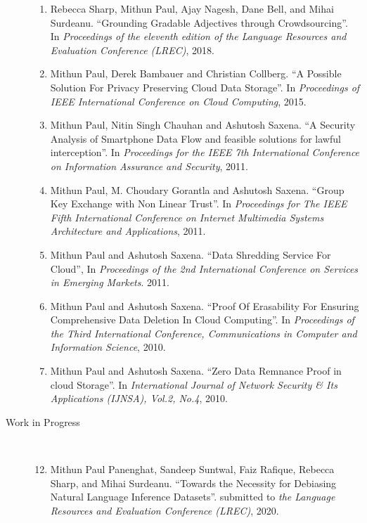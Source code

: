 \documentclass[10pt]{article}
\newcommand{\ve}[1]{{\em #1}} %
\newcommand{\ti}[1]{``#1''} %
\begin{document}
\begin{description}
\begin{enumerate}
\item Rebecca Sharp, Mithun Paul, Ajay Nagesh, Dane  Bell, and Mihai Surdeanu.   \ti{Grounding Gradable Adjectives through Crowdsourcing}. In \ve{Proceedings of the eleventh edition of the Language Resources and Evaluation Conference (LREC)}, 2018.

\item Mithun Paul, Derek Bambauer and Christian Collberg.   \ti{A Possible Solution For Privacy Preserving Cloud Data Storage}. In \ve{Proceedings of IEEE International Conference on Cloud Computing}, 2015.

\item  Mithun Paul, Nitin Singh Chauhan and Ashutosh Saxena.   \ti{A Security Analysis of Smartphone Data Flow and feasible solutions for lawful interception}. In \ve{ Proceedings for the IEEE 7th International Conference on Information Assurance and Security}, 2011.

\item  Mithun Paul, M. Choudary Gorantla and Ashutosh Saxena.   \ti{Group Key Exchange with Non Linear Trust}. In \ve{ Proceedings for The IEEE Fifth International Conference on Internet Multimedia Systems Architecture and Applications}, 2011.

\item  Mithun Paul and Ashutosh Saxena.   \ti{Data Shredding Service For Cloud}, In \ve{  Proceedings of the 2nd International Conference on Services in Emerging Markets}. 2011.

\item  Mithun Paul and Ashutosh Saxena.   \ti{Proof Of Erasability For Ensuring Comprehensive Data Deletion In Cloud Computing}. In \ve{  Proceedings of the Third International Conference, Communications in Computer and Information Science}, 2010.

\item  Mithun Paul and Ashutosh Saxena.   \ti{Zero Data Remnance Proof in cloud Storage}. In \ve{  International Journal of Network Security \& Its Applications (IJNSA), Vol.2, No.4}, 2010.




\end{enumerate}


\item [Work in Progress] \
\begin{enumerate}
\setcounter{enumi}{11}

\item Mithun Paul Panenghat, Sandeep Suntwal, Faiz Rafique, Rebecca Sharp, and Mihai Surdeanu.   \ti{Towards the Necessity for Debiasing Natural Language Inference Datasets}. submitted to \ve{the Language Resources and Evaluation Conference (LREC)}, 2020.


\end{enumerate}
\end{description}
\end{document}

